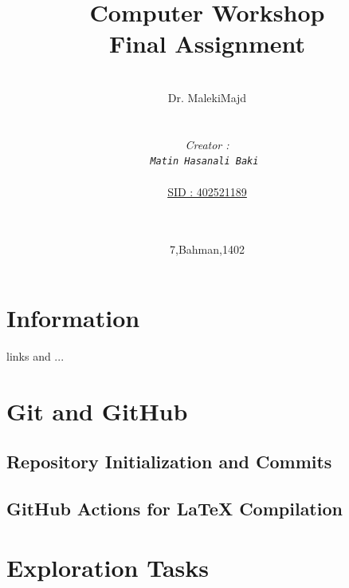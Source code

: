\documentclass[12pt]{article}
\begin{document}
\title{Computer Workshop\\Final Assignment} 
\date{ 7,Bahman,1402 } %
\author{\\ Dr. MalekiMajd \\ \\ \\ \emph{Creator :}\\ \emph{\texttt{Matin Hasanali Baki }}  \\ \\ \underline{SID :    402521189} \\ \\ \\  }
\maketitle

\newpage
\begin{quote}
\end{quote}
\tableofcontents

\newpage




\section*{Information}
links and ...


\section{Git and GitHub}
\subsection{Repository Initialization and Commits}


\subsection{GitHub Actions for LaTeX Compilation}



\section{Exploration Tasks}
\end{document}

